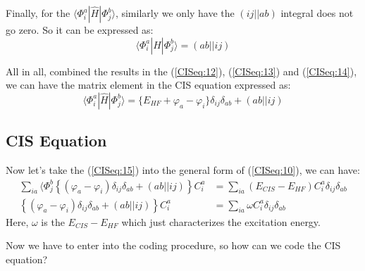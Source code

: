 Finally, for the $\langle\Phi_{i}^{a}|\hat{H}|\Phi_{j}^{b}\rangle$,
similarly we only have the $(ij||ab)$ integral does not go zero. So it
can be expressed as:
\begin{equation}
  \label{CISeq:14}
  \langle\Phi_{i}^{a}|\hat{H}|\Phi_{j}^{b}\rangle = (ab||ij)
\end{equation}

All in all, combined the results in the (\ref{CISeq:12}),
(\ref{CISeq:13}) and (\ref{CISeq:14}), we can have the matrix element
in the CIS equation expressed as:
\begin{equation}
  \label{CISeq:15}
  \langle\Phi_{i}^{a}|\hat{H}|\Phi_{j}^{b}\rangle = \Big\{ E_{HF} +
    \varphi_{a} - \varphi_{i}\Big\}\delta_{ij}\delta_{ab} + (ab||ij)
\end{equation}

\subsection{CIS Equation}
\label{sec:CIS_solution}
%
%
%
%
%
Now let's take the (\ref{CISeq:15}) into the general form of
(\ref{CISeq:10}), we can have:
\begin{align}
 \label{CISeq:16}
 \sum_{ia}\langle\Phi_{j}^{b}
\left\lbrace (\varphi_{a} - \varphi_{i})\delta_{ij}\delta_{ab} +
(ab||ij)\right\rbrace  C_{i}^{a}
 &=  \sum_{ia}(E_{CIS} -E_{HF})C_{i}^{a}\delta_{ij}\delta_{ab}
\nonumber \\
\left\lbrace
(\varphi_{a} - \varphi_{i})\delta_{ij}\delta_{ab} +
(ab||ij)\right\rbrace  C_{i}^{a} &= \sum_{ia}\omega
C_{i}^{a}\delta_{ij}\delta_{ab} 
\end{align}
Here, $\omega$ is the $E_{CIS} -E_{HF}$ which just characterizes the
excitation energy.

Now we have to enter into the coding procedure, so how can we code
the CIS equation?



